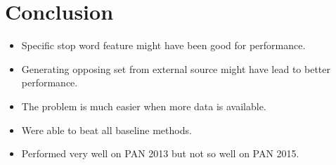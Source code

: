 \section{Conclusion} \label{sec:conclusion}

\begin{itemize}
    \item Specific stop word feature might have been good for performance.
    \item Generating opposing set from external source might have lead to better
        performance.
    \item The problem is much easier when more data is available.
    \item Were able to beat all baseline methods.
    \item Performed very well on PAN 2013 but not so well on PAN 2015.
\end{itemize}
